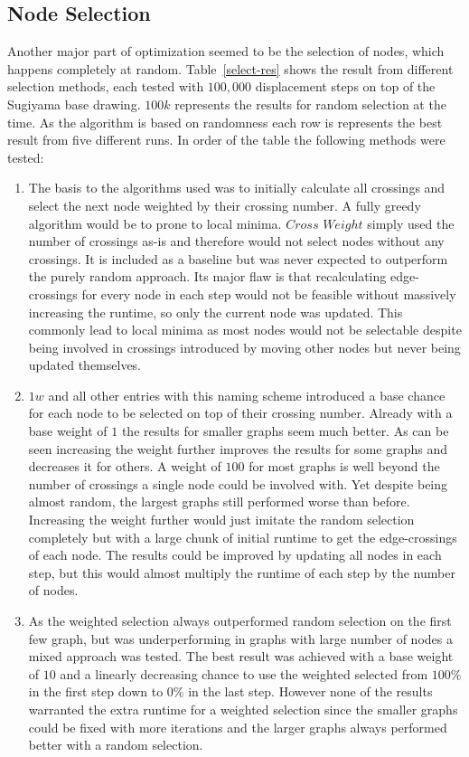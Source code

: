 \documentclass[]{llncs}
\begin{document}
    \subsection{Node Selection}
	Another major part of optimization seemed to be the selection of nodes, which happens completely at random. Table~\ref{select-res} shows the result from different selection methods, each tested with $100,000$ displacement steps on top of the Sugiyama base drawing. $100k$ represents the results for random selection at the time. As the algorithm is based on randomness each row is represents the best result from five different runs. In order of the table the following methods were tested:
	\begin{enumerate}
		\item The basis to the algorithms used was to initially calculate all crossings and select the next node weighted by their crossing number. A fully greedy algorithm would be to prone to local minima. $Cross$ $Weight$ simply used the number of crossings as-is and therefore would not select nodes without any crossings. It is included as a baseline but was never expected to outperform the purely random approach. Its major flaw is that recalculating edge-crossings for every node in each step would not be feasible without massively increasing the runtime, so only the current node was updated. This commonly lead to local minima as most nodes would not be selectable despite being involved in crossings introduced by moving other nodes but never being updated themselves.
		\item $1w$ and all other entries with this naming scheme introduced a base chance for each node to be selected on top of their crossing number. Already with a base weight of $1$ the results for smaller graphs seem much better. As can be seen increasing the weight further improves the results for some graphs and decreases it for others. A weight of $100$ for most graphs is well beyond the number of crossings a single node could be involved with. Yet despite being almost random, the largest graphs still performed worse than before. Increasing the weight further would just imitate the random selection completely but with a large chunk of initial runtime to get the edge-crossings of each node. The results could be improved by updating all nodes in each step, but this would almost multiply the runtime of each step by the number of nodes.
		\item As the weighted selection always outperformed random selection on the first few graph, but was underperforming in graphs with large number of nodes a mixed approach was tested. The best result was achieved with a base weight of $10$ and a linearly decreasing chance to use the weighted selected from $100\%$ in the first step down to $0\%$ in the last step. However none of the results warranted the extra runtime for a weighted selection since the smaller graphs could be fixed with more iterations and the larger graphs always performed better with a random selection.
	\end{enumerate}
\end{document}
